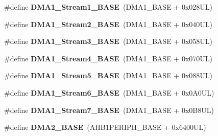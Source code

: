 \begin{DoxyCompactItemize}
\item 
\mbox{\label{group___peripheral__memory__map_ga5b4152cef577e37eccc9311d8bdbf3c2}} 
\#define {\bfseries D\+M\+A1\+\_\+\+Stream1\+\_\+\+B\+A\+SE}~(D\+M\+A1\+\_\+\+B\+A\+SE + 0x028\+U\+L)
\item 
\mbox{\label{group___peripheral__memory__map_ga48a551ee91d3f07dd74347fdb35c703d}} 
\#define {\bfseries D\+M\+A1\+\_\+\+Stream2\+\_\+\+B\+A\+SE}~(D\+M\+A1\+\_\+\+B\+A\+SE + 0x040\+U\+L)
\item 
\mbox{\label{group___peripheral__memory__map_gac51deb54ff7cfe1290dfcf517ae67127}} 
\#define {\bfseries D\+M\+A1\+\_\+\+Stream3\+\_\+\+B\+A\+SE}~(D\+M\+A1\+\_\+\+B\+A\+SE + 0x058\+U\+L)
\item 
\mbox{\label{group___peripheral__memory__map_ga757a3c0d866c0fe68c6176156065a26b}} 
\#define {\bfseries D\+M\+A1\+\_\+\+Stream4\+\_\+\+B\+A\+SE}~(D\+M\+A1\+\_\+\+B\+A\+SE + 0x070\+U\+L)
\item 
\mbox{\label{group___peripheral__memory__map_ga0ded7bed8969fe2e2d616e7f90eb7654}} 
\#define {\bfseries D\+M\+A1\+\_\+\+Stream5\+\_\+\+B\+A\+SE}~(D\+M\+A1\+\_\+\+B\+A\+SE + 0x088\+U\+L)
\item 
\mbox{\label{group___peripheral__memory__map_ga58998ddc40adb6361704d6c9dad08125}} 
\#define {\bfseries D\+M\+A1\+\_\+\+Stream6\+\_\+\+B\+A\+SE}~(D\+M\+A1\+\_\+\+B\+A\+SE + 0x0\+A0\+U\+L)
\item 
\mbox{\label{group___peripheral__memory__map_ga82186dd6d3f60995d428b34c041919d7}} 
\#define {\bfseries D\+M\+A1\+\_\+\+Stream7\+\_\+\+B\+A\+SE}~(D\+M\+A1\+\_\+\+B\+A\+SE + 0x0\+B8\+U\+L)
\item 
\mbox{\label{group___peripheral__memory__map_gab72a9ae145053ee13d1d491fb5c1df64}} 
\#define {\bfseries D\+M\+A2\+\_\+\+B\+A\+SE}~(A\+H\+B1\+P\+E\+R\+I\+P\+H\+\_\+\+B\+A\+SE + 0x6400\+U\+L)
\item 
\mbox{\label{group___peripheral__memory__map_gac4c67b24726ba6b94d03adb351bcec4d}} 

\end{DoxyCompactItemize}
